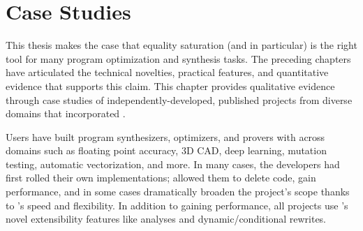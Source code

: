 \chapter{Case Studies}
\label{sec:case-studies}

This thesis makes the case that equality saturation
 (and \egg in particular)
 is the right tool for
 many program optimization and synthesis tasks.
The preceding chapters have articulated the
 technical novelties, practical features,
 and quantitative evidence that supports this claim.
This chapter provides qualitative evidence through case studies
 of independently-developed, published\footnotemark{}
 projects from diverse domains
 that incorporated \egg.

Users have built program synthesizers, optimizers, and provers
 with \egg across domains such as
 floating point accuracy, 3D CAD, deep learning, mutation testing,
 automatic vectorization, and more.
In many cases, the developers had first rolled their own \egraph
 implementations;
 \egg allowed them to delete code, gain performance, and in some cases
 dramatically broaden the project's scope thanks to \egg's speed and
 flexibility.
In addition to gaining performance, all projects use \egg's novel
  extensibility features like \eclass analyses and dynamic/conditional rewrites.


 
 
 

